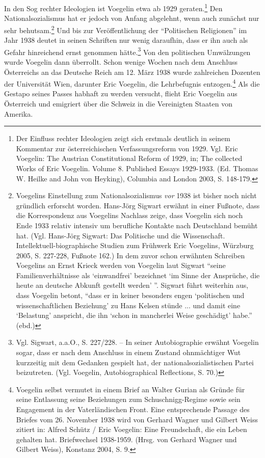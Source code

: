 \documentclass[12pt,a4paper,ngerman]{article}
\begin{document}
In den Sog rechter Ideologien ist Voegelin etwa ab 1929
geraten.\footnote{Der Einfluss rechter Ideologien zeigt sich erstmals
  deutlich in seinem Kommentar zur österreichischen Verfassungsreform
  von 1929. Vgl. Eric Voegelin: The Austrian Constitutional Reform of
  1929, in; The collected Works of Eric Voegelin. Volume 8. Published
  Essays 1929-1933. (Ed. Thomas W. Heilke and John von Heyking),
  Columbia and London 2003, S. 148-179.} Den Nationalsozialismus hat
er jedoch von Anfang abgelehnt, wenn auch zunächst nur sehr
behutsam.\footnote{Voegelins Einstellung zum Nationalsozialismus {\em
    vor} 1938 ist bisher noch nicht gründlich erforscht worden.
  Hans-Jörg Sigwart erwähnt in einer Fußnote, dass die Korrespondenz
  aus Voegelins Nachlass zeige, dass Voegelin sich noch Ende 1933
  relativ intensiv um berufliche Kontakte nach Deutschland bemüht hat.
  (Vgl. Hans-Jörg Sigwart: Das Politische und die Wissenschaft.
  Intellektuell-biographische Studien zum Frühwerk Eric Voegelins,
  Würzburg 2005, S. 227-228, Fußnote 162.) In dem zuvor schon
  erwähnten Schreiben Voegelins an Ernst Krieck werden von Voegelin
  laut Sigwart "`seine Familienverhältnisse als `einwandfrei'
  bezeichnet `im Sinne der Ansprüche, die heute an deutsche Abkunft
  gestellt werden' "'. Sigwart führt weiterhin aus, dass Voegelin
  betont, "`dass er in keiner besonders engen `politischen und
  wissenschaftlichen Beziehung' zu Hans Kelsen stünde ... und damit
  eine `Belastung' anspricht, die ihn `schon in mancherlei Weise
  geschädigt' habe."'  (ebd.)} Und bis zur Veröffentlichung der
"`Politischen Religionen"' im Jahr 1938 deutet in seinen
Schriften nur wenig daraufhin, dass er ihn auch als Gefahr
hinreichend ernst genommen hätte.\footnote{Vgl.  Sigwart, a.a.O., S.
  227/228. -- In seiner Autobiographie erwähnt Voegelin sogar, dass er
  nach dem Anschluss in einem Zustand ohnmächtiger Wut kurzzeitig mit
  dem Gedanken gespielt hat, der nationalsozialistischen Partei
  beizutreten. (Vgl.  Voegelin, Autobiographical Reflections, S. 70.)}
Von den politischen Umwälzungen wurde Voegelin dann überrollt. Schon
wenige Wochen nach dem Anschluss Österreichs an das Deutsche Reich am
12.  März 1938 wurde zahlreichen Dozenten der Universität Wien,
darunter Eric Voegelin, die Lehrbefugnis entzogen.\footnote{Voegelin
  selbst vermutet in einem Brief an Walter Gurian als Gründe für seine
  Entlassung seine Beziehungen zum Schuschnigg-Regime sowie sein
  Engagement in der Vaterländischen Front. Eine entsprechende Passage
  des Briefes vom 26. November 1938 wird von Gerhard Wagner und
  Gilbert Weiss zitiert in: Alfred Schütz / Eric Voegelin: Eine
  Freundschaft, die ein Leben gehalten hat.  Briefwechsel 1938-1959.
  (Hrsg. von Gerhard Wagner und Gilbert Weiss), Konstanz 2004, S. 9.}
Als die Gestapo seines Passes habhaft zu werden versucht, flieht Eric
Voegelin aus Österreich und emigriert über die Schweiz in die
Vereinigten Staaten von Amerika. 
\end{document}

